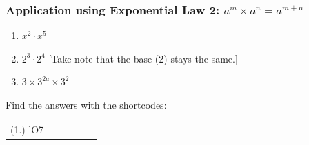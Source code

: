 	\par
\label{m38359*secfhsst!!!underscore!!!id614}
            \subsubsection{  Application using Exponential Law 2: ${a}^{m}\ensuremath{\times}{a}^{n}={a}^{m+n}$ }
            \nopagebreak
        \label{m38359*id64269}\begin{enumerate}[noitemsep, label=\textbf{\arabic*}. ] 
            \label{m38359*uid13}\item 
            ${x}^{2}\ensuremath{\cdot}{x}^{5}$
      \label{m38359*uid14}\item 
        ${2}^{3}\ensuremath{\cdot}{2}^{4}$
        [Take note that the base (2) stays the same.]
      \label{m38359*uid15}\item 
        $3\ensuremath{\times}{3}^{2a}\ensuremath{\times}{3}^{2}$
\newline
\newline
          \end{enumerate}
      \label{m38359*uid16}
\par {} Find the answers with the shortcodes:
 \par \begin{tabular}[h]{cccccc}
 (1.) lO7  & \end{tabular}
